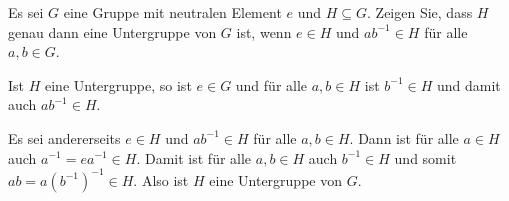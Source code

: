 \begin{question}
 Es sei $G$ eine Gruppe mit neutralen Element $e$ und $H \subseteq G$. Zeigen Sie, dass $H$ genau dann eine Untergruppe von $G$ ist, wenn $e \in H$ und $a b^{-1} \in H$ für alle $a,b \in G$.
\end{question}
\begin{solution}
 Ist $H$ eine Untergruppe, so ist $e \in G$ und für alle $a,b \in H$ ist $b^{-1} \in H$ und damit auch $ab^{-1} \in H$.
 
 Es sei andererseits $e \in H$ und $ab^{-1} \in H$ für alle $a,b \in H$. Dann ist für alle $a \in H$ auch $a^{-1} = ea^{-1} \in H$. Damit ist für alle $a,b \in H$ auch $b^{-1} \in H$ und somit $ab = a(b^{-1})^{-1} \in H$. Also ist $H$ eine Untergruppe von $G$.
\end{solution}



